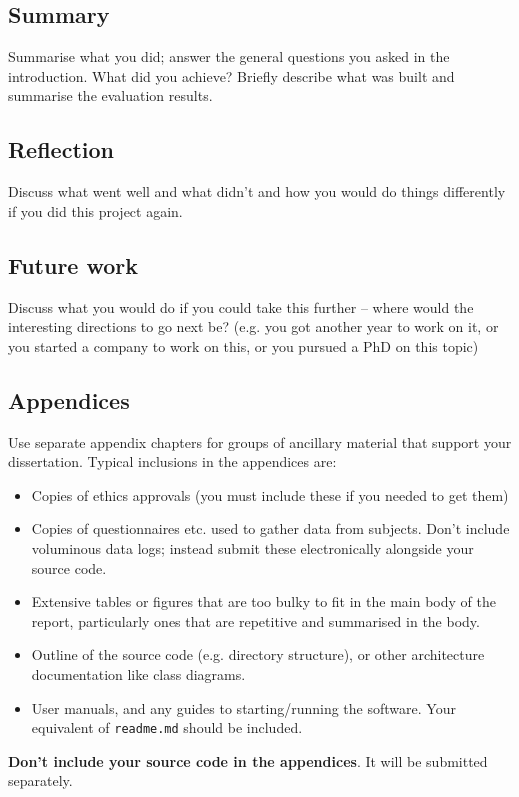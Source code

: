 \documentclass{l4proj}
\begin{document}
\section{Summary}
Summarise what you did; answer the general questions you asked in the introduction. What did you achieve? Briefly describe what was built and summarise the evaluation results.

\section{Reflection}
Discuss what went well and what didn't and how you would do things differently if you did this project again.

\section{Future work}
Discuss what you would do if you could take this further -- where would the interesting directions to go next be? (e.g. you got another year to work on it, or you started a company to work on this, or you pursued a PhD on this topic)

%
% 

\begin{appendices}

\chapter{Appendices}

Use separate appendix chapters for groups of ancillary material that support your dissertation. 
Typical inclusions in the appendices are:

\begin{itemize}
\item
  Copies of ethics approvals (you must include these if you needed to get them)
\item
  Copies of questionnaires etc. used to gather data from subjects. Don't include
  voluminous data logs; instead submit these electronically alongside your source code.
\item
  Extensive tables or figures that are too bulky to fit in the main body of
  the report, particularly ones that are repetitive and summarised in the body.
\item Outline of the source code (e.g. directory structure), 
    or other architecture documentation like class diagrams.
\item User manuals, and any guides to starting/running the software. 
Your equivalent of \texttt{readme.md} should be included.

\end{itemize}

\textbf{Don't include your source code in the appendices}. It will be
submitted separately.



\end{appendices}
\end{document}
